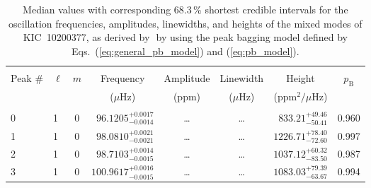 \begin{table*}[!]
\caption{Median values with corresponding 68.3\,\% shortest credible intervals for the oscillation frequencies, amplitudes, linewidths, and heights of the mixed modes of KIC~10200377, as derived by \diamonds\,\,by using the peak bagging model defined by Eqs.~(\ref{eq:general_pb_model}) and (\ref{eq:pb_model}).}
\label{tab:10200377m}
\centering
\begin{tabular}{llcrrlrc}
\hline\hline
\\[-8pt]      
Peak \# & $\ell$ & $m$ & \multicolumn{1}{c}{Frequency} & \multicolumn{1}{c}{Amplitude} & \multicolumn{1}{c}{Linewidth} & \multicolumn{1}{c}{Height}& $p_\mathrm{B}$\\
 & & & \multicolumn{1}{c}{($\mu$Hz)} & \multicolumn{1}{c}{(ppm)} & \multicolumn{1}{c}{($\mu$Hz)} & \multicolumn{1}{c}{(ppm$^2/\mu$Hz)}\\
\hline \\[-8pt]
0 & 1 & 0 & $     96.1205_{-      0.0014}^{+      0.0017}$ & \multicolumn{1}{c}{\dots} & \multicolumn{1}{c}{\dots} & $      833.21_{-       50.41}^{+       49.46}$ & 0.960\\[1pt]
1 & 1 & 0 & $     98.0810_{-      0.0021}^{+      0.0021}$ & \multicolumn{1}{c}{\dots} & \multicolumn{1}{c}{\dots} & $     1226.71_{-       72.60}^{+       78.40}$ & 0.997\\[1pt]
2 & 1 & 0 & $     98.7103_{-      0.0015}^{+      0.0014}$ & \multicolumn{1}{c}{\dots} & \multicolumn{1}{c}{\dots} & $     1037.12_{-       83.50}^{+       60.32}$ & 0.987\\[1pt]
3 & 1 & 0 & $    100.9617_{-      0.0015}^{+      0.0016}$ & \multicolumn{1}{c}{\dots} & \multicolumn{1}{c}{\dots} & $     1083.03_{-       63.67}^{+       79.39}$ & 0.994\\[1pt]


\end{tabular}
\end{table*}

